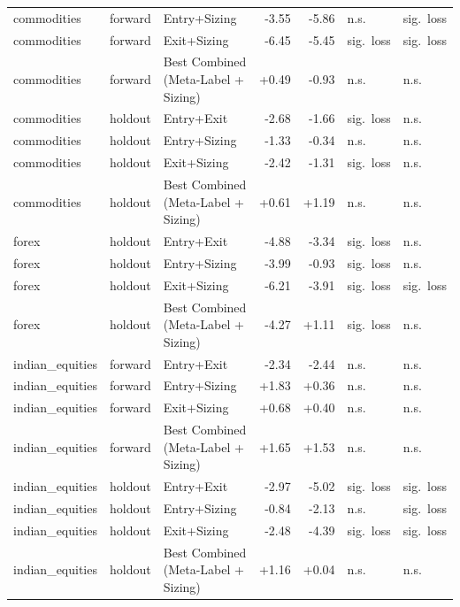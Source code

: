 \begin{longtable}{l l l r r l l}
commodities & forward & Entry+Sizing & -3.55 & -5.86 & n.s. & sig.\ loss \\
commodities & forward & Exit+Sizing & -6.45 & -5.45 & sig.\ loss & sig.\ loss \\
commodities & forward & Best Combined (Meta-Label + Sizing) & +0.49 & -0.93 & n.s. & n.s. \\
commodities & holdout & Entry+Exit & -2.68 & -1.66 & sig.\ loss & n.s. \\
commodities & holdout & Entry+Sizing & -1.33 & -0.34 & n.s. & n.s. \\
commodities & holdout & Exit+Sizing & -2.42 & -1.31 & sig.\ loss & n.s. \\
commodities & holdout & Best Combined (Meta-Label + Sizing) & +0.61 & +1.19 & n.s. & n.s. \\
forex & holdout & Entry+Exit & -4.88 & -3.34 & sig.\ loss & n.s. \\
forex & holdout & Entry+Sizing & -3.99 & -0.93 & sig.\ loss & n.s. \\
forex & holdout & Exit+Sizing & -6.21 & -3.91 & sig.\ loss & sig.\ loss \\
forex & holdout & Best Combined (Meta-Label + Sizing) & -4.27 & +1.11 & sig.\ loss & n.s. \\
indian\_equities & forward & Entry+Exit & -2.34 & -2.44 & n.s. & n.s. \\
indian\_equities & forward & Entry+Sizing & +1.83 & +0.36 & n.s. & n.s. \\
indian\_equities & forward & Exit+Sizing & +0.68 & +0.40 & n.s. & n.s. \\
indian\_equities & forward & Best Combined (Meta-Label + Sizing) & +1.65 & +1.53 & n.s. & n.s. \\
indian\_equities & holdout & Entry+Exit & -2.97 & -5.02 & sig.\ loss & sig.\ loss \\
indian\_equities & holdout & Entry+Sizing & -0.84 & -2.13 & n.s. & sig.\ loss \\
indian\_equities & holdout & Exit+Sizing & -2.48 & -4.39 & sig.\ loss & sig.\ loss \\
indian\_equities & holdout & Best Combined (Meta-Label + Sizing) & +1.16 & +0.04 & n.s. & n.s. \\
\end{longtable}
